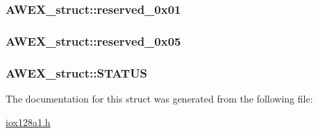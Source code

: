 \label{struct_a_w_e_x__struct_ae06cae530bfd7850f10c2354ccf9e21f}
\hypertarget{struct_a_w_e_x__struct_aa30b96a5ec2d96a93cb82aacfbd1340f}{
\subsubsection[{reserved\_\-0x01}]{ {\bf AWEX\_\-struct::reserved\_\-0x01}}}
\label{struct_a_w_e_x__struct_aa30b96a5ec2d96a93cb82aacfbd1340f}
\hypertarget{struct_a_w_e_x__struct_aef895e95ce97706f18e130dba875f58e}{
\subsubsection[{reserved\_\-0x05}]{ {\bf AWEX\_\-struct::reserved\_\-0x05}}}
\label{struct_a_w_e_x__struct_aef895e95ce97706f18e130dba875f58e}
\hypertarget{struct_a_w_e_x__struct_acffb4313fe7461a88478648e4fa28242}{
\subsubsection[{STATUS}]{ {\bf AWEX\_\-struct::STATUS}}}
\label{struct_a_w_e_x__struct_acffb4313fe7461a88478648e4fa28242}


The documentation for this struct was generated from the following file:\begin{DoxyCompactItemize}
\item 
\hyperlink{iox128a1_8h}{iox128a1.h}\end{DoxyCompactItemize}
